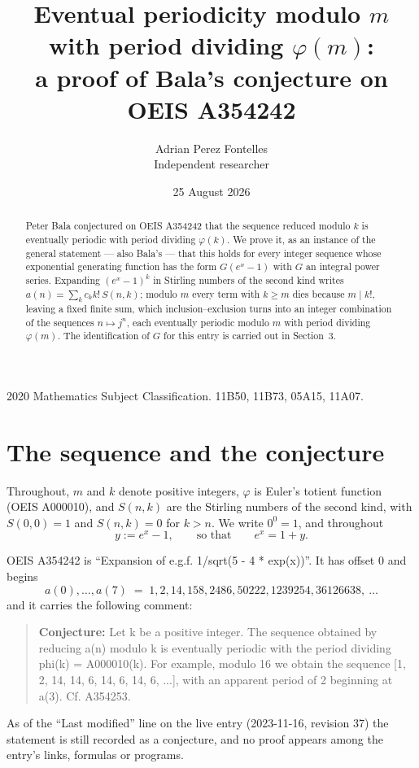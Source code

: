 \documentclass[11pt,a4paper]{article}
\title{Eventual periodicity modulo $m$ with period dividing $\varphi(m)$:\\a proof of Bala's conjecture on OEIS A354242}
\author{Adrian Perez Fontelles\\ \small Independent researcher}
\date{25 August 2026}
\theoremstyle{plain}
\theoremstyle{definition}
\begin{document}
\maketitle

\begin{abstract}
Peter Bala conjectured on OEIS A354242 that the sequence reduced modulo $k$ is eventually periodic with period dividing $\varphi(k)$. We prove it, as an instance of the general statement --- also Bala's --- that this holds for every integer sequence whose exponential generating function has the form $G(e^{x}-1)$ with $G$ an integral power series. Expanding $(e^{x}-1)^{k}$ in Stirling numbers of the second kind writes $a(n)=\sum_{k}c_{k}k!\,S(n,k)$; modulo $m$ every term with $k\ge m$ dies because $m\mid k!$, leaving a fixed finite sum, which inclusion--exclusion turns into an integer combination of the sequences $n\mapsto j^{n}$, each eventually periodic modulo $m$ with period dividing $\varphi(m)$. The identification of $G$ for this entry is carried out in Section~3.
\end{abstract}

\noindent\small 2020 Mathematics Subject Classification. 11B50, 11B73, 05A15, 11A07.\normalsize

\section{The sequence and the conjecture}

Throughout, $m$ and $k$ denote positive integers, $\varphi$ is Euler's totient function
(OEIS A000010), and $S(n,k)$ are the Stirling numbers of the second kind, with
$S(0,0)=1$ and $S(n,k)=0$ for $k>n$. We write $0^{0}=1$, and throughout
\[
y := e^{x}-1, \qquad\text{so that}\qquad e^{x}=1+y .
\]

OEIS A354242 is ``Expansion of e.g.f. 1/sqrt(5 - 4 * exp(x))''. It has offset $0$ and begins
\[
a(0),\dots,a(7)\;=\;1, 2, 14, 158, 2486, 50222, 1239254, 36126638,\ \dots
\]
and it carries the following comment:
\begin{quote}\small
\textbf{Conjecture:} Let k be a positive integer. The sequence obtained by reducing a(n) modulo k is eventually periodic with the period dividing phi(k) = A000010(k). For example, modulo 16 we obtain the sequence [1, 2, 14, 14, 6, 14, 6, 14, 6, ...], with an apparent period of 2 beginning at a(3). Cf. A354253.
\end{quote}
As of the ``Last modified'' line on the live entry (2023-11-16, revision 37) the
statement is still recorded as a conjecture, and no proof appears among the entry's links,
formulas or programs.
\end{document}
